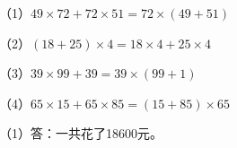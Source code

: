 
\begingroup\color{answerred}\noindent（1）$49\times72+72\times51=72\times(49+51)$\par
\noindent（2）$(18+25)\times4=18\times4+25\times4$\par
\noindent（3）$39\times99+39=39\times(99+1)$\par
\noindent（4）$65\times15+65\times85=(15+85)\times65$\par\par\endgroup
{}
\begingroup\color{answerred}\par\endgroup
{}
\begingroup\color{answerred}\noindent（1）答：一共花了18600元。\par\par\endgroup
